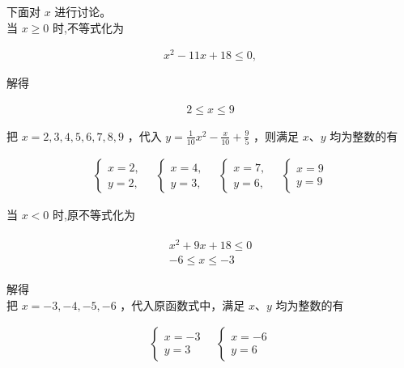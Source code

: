 \documentclass[10pt]{article}
\begin{document}
下面对 $x$ 进行讨论。\\
当 $x \geqslant 0$ 时,不等式化为

\begin{align*}
x^{2}-11 x+18 \leqslant 0,
\end{align*}

解得

\begin{align*}
2 \leqslant x \leqslant 9
\end{align*}

把 $x=2,3,4,5,6,7,8,9$ ，代入 $y=\frac{1}{10} x^{2}-\frac{x}{10}+\frac{9}{5}$ ，则满足 $x 、 y$ 均为整数的有

\begin{align*}
\left\{\begin{array} { l } 
{ x = 2 , } \\
{ y = 2 , }
\end{array} \quad \left\{\begin{array} { l } 
{ x = 4 , } \\
{ y = 3 , }
\end{array} \quad \left\{\begin{array} { l } 
{ x = 7 , } \\
{ y = 6 , }
\end{array} \quad \left\{\begin{array}{l}
x=9 \\
y=9
\end{array}\right.\right.\right.\right.
\end{align*}

当 $x<0$ 时,原不等式化为

\begin{align*}
\begin{gathered}
x^{2}+9 x+18 \leqslant 0 \\
-6 \leqslant x \leqslant-3
\end{gathered}
\end{align*}

解得\\
把 $x=-3,-4,-5,-6$ ，代入原函数式中，满足 $x 、 y$ 均为整数的有

\begin{align*}
\left\{\begin{array} { l } 
{ x = - 3 } \\
{ y = 3 }
\end{array} \quad \left\{\begin{array}{l}
x=-6 \\
y=6
\end{array}\right.\right.
\end{align*}
\end{document}
